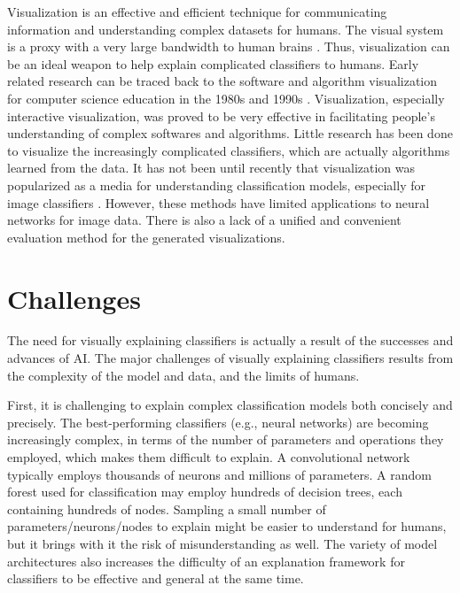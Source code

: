 Visualization is an effective and efficient technique for communicating information and understanding complex datasets for humans. The visual system is a proxy with a very large bandwidth to human brains \cite{munzner2014visualization}. Thus, visualization can be an ideal weapon to help explain complicated classifiers to humans. Early related research can be traced back to the software and algorithm visualization for computer science education in the 1980s and 1990s \cite{brown1987aa,stasko1990aa,price1992taxonomy}. Visualization, especially interactive visualization, was proved to be very effective in facilitating people's understanding of complex softwares and algorithms.
Little research has been done to visualize the increasingly complicated classifiers, which are actually algorithms learned from the data. It has not been until recently that visualization was popularized as a media for understanding classification models, especially for image classifiers \cite{simonyan14saliency,zeiler2014eccv,bach15plos,zintgraf17visualize}. However, these methods have limited applications to neural networks for image data. There is also a lack of a unified and convenient evaluation method for the generated visualizations. 

\section{Challenges}

The need for visually explaining classifiers is actually a result of the successes and advances of AI. The major challenges of visually explaining classifiers results from the complexity of the model and data, and the limits of humans.

First, it is challenging to explain complex classification models both concisely and precisely. The best-performing classifiers (e.g., neural networks) are becoming increasingly complex, in terms of the number of parameters and operations they employed, which makes them difficult to explain. A convolutional network typically employs thousands of neurons and millions of parameters. A random forest used for classification may employ hundreds of decision trees, each containing hundreds of nodes. Sampling a small number of parameters/neurons/nodes to explain might be easier to understand for humans, but it brings with it the risk of misunderstanding as well. The variety of model architectures also increases the difficulty of an explanation framework for classifiers to be effective and general at the same time. 

